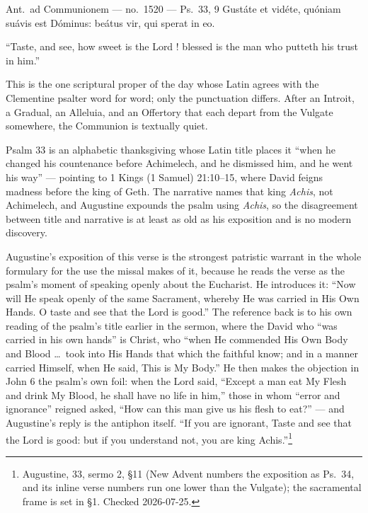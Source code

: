 \begin{appointed}{Ant.\ ad Communionem --- no.\ 1520 --- Ps.\ 33, 9}
Gustáte et vidéte, quóniam suávis est Dóminus: beátus vir, qui sperat in eo.
\end{appointed}

\begin{englishwitness}
``Taste, and see, how sweet is the Lord ! blessed is the man who putteth his
trust in him.''
\end{englishwitness}

This is the one scriptural proper of the day whose Latin agrees with the
Clementine psalter word for word; only the punctuation differs. After an
Introit, a Gradual, an Alleluia, and an Offertory that each depart from the
Vulgate somewhere, the Communion is textually quiet.

Psalm 33 is an alphabetic thanksgiving whose Latin title places it ``when he
changed his countenance before Achimelech, and he dismissed him, and he went his
way'' --- pointing to 1 Kings (1 Samuel) 21:10--15, where David feigns madness
before the king of Geth. The narrative names that king \emph{Achis}, not
Achimelech, and Augustine expounds the psalm using \emph{Achis}, so the
disagreement between title and narrative is at least as old as his exposition
and is no modern discovery.

Augustine's exposition of this verse is the strongest patristic warrant in the
whole formulary for the use the missal makes of it, because he reads the verse
as the psalm's moment of speaking openly about the Eucharist. He introduces it:
``Now will He speak openly of the same Sacrament, whereby He was carried in His
Own Hands. O taste and see that the Lord is good.'' The reference back is to his
own reading of the psalm's title earlier in the sermon, where the David who
``was carried in his own hands'' is Christ, who ``when He commended His Own Body
and Blood \dots\ took into His Hands that which the faithful know; and in a
manner carried Himself, when He said, This is My Body.'' He then makes the
objection in John 6 the psalm's own foil: when the Lord said, ``Except a man eat
My Flesh and drink My Blood, he shall have no life in him,'' those in whom
``error and ignorance'' reigned asked, ``How can this man give us his flesh to
eat?'' --- and Augustine's reply is the antiphon itself. ``If you are ignorant,
Taste and see that the Lord is good: but if you understand not, you are king
Achis.''\footnote{Augustine,  33, sermo 2, §11 (New Advent
numbers the exposition as Ps.\ 34, and its inline verse numbers run one lower
than the Vulgate); the sacramental frame is set in §1. Checked 2026-07-25.}

